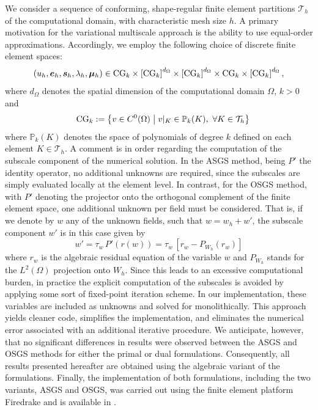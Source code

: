 We consider a sequence of conforming, shape-regular finite element partitions $\mathcal{T}_h$ of the computational domain, with characteristic mesh size $h$. A primary motivation for the variational multiscale approach is the ability to use equal-order approximations. Accordingly, we employ the following choice of discrete finite element spaces:
\begin{equation*}\label{eq:equal_order_func_spaces}
	\left(u_{h}, \bm{e}_{h}, \bm{s}_{h}, \lambda_{h}, \bm{\mu}_{h}\right)
	\in
	\text{CG}_{k} \times \left[\text{CG}_{k}\right]^{d_{\Omega}}
	\times \left[\text{CG}_{k}\right]^{d_{\Omega}}
	\times \text{CG}_{k}
	\times \left[\text{CG}_{k}\right]^{d_{\Omega}},
\end{equation*}
where $d_{\Omega}$ denotes the spatial dimension of the computational domain $\Omega$, $k>0$ and 
\begin{equation*}
	\quad \text{CG}_{k} := \left\{ v \in C^0(\Omega) \;\middle|\; v|_K \in \mathbb{P}_k(K),\ \forall K \in \mathcal{T}_h \right\}	
\end{equation*}
where $\mathbb{P}_k(K)$ denotes the space of polynomials of degree $k$ defined on each element $K \in \mathcal{T}_h$.
A comment is in order regarding the computation of the subscale component of the numerical
solution. In the ASGS method, being $P'$ the identity operator, no additional unknowns are
required, since the subscales are simply evaluated locally at the element level. In contrast, 
for the OSGS method, with $P'$ denoting the projector onto the orthogonal complement of the 
finite element space, one additional unknown per field must be considered.
That is, if we denote by $w$ any of the unknown fields, such that $w = w_h + w'$, 
the subscale component $w'$ is in this case given by
\begin{equation}
w' = \tau_w \, P' \left ( r(w) \right ) = \tau_w \, \left [ r_w - P_{W_{h}} \left ( r_w \right ) \right ]
\end{equation}
where $r_w$ is the algebraic residual equation of the variable $w$ and $P_{W_{h}}$ stands for the $L^2(\Omega)$ projection onto $W_h$.
Since this leads to an excessive computational burden, in practice the explicit computation 
of the subscales is avoided by applying some sort of fixed-point iteration scheme. 
In our implementation, these variables are included as unknowns and solved for 
monolithically. This approach yields cleaner code, simplifies the implementation, 
and eliminates the numerical error associated with an additional iterative procedure. 
We anticipate, however, that no significant differences in results were observed between the 
ASGS and OSGS methods for either the primal or dual formulations. 
Consequently, all results presented hereafter are obtained using the algebraic variant 
of the formulations. Finally, the implementation of both formulations, including the two variants,
ASGS and OSGS, was carried out using the finite element platform Firedrake \cite{firedrake} and is available in \cite{githubrepoddcm}.

